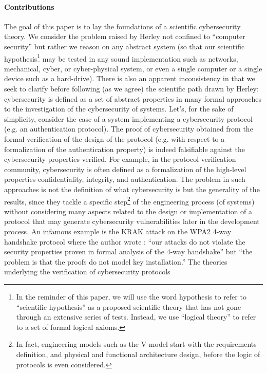 \documentclass[conference]{IEEEtran}
\begin{document}
\paragraph{Contributions} 
The goal of this paper is to lay the foundations of a scientific cybersecurity
theory.  We consider the problem raised by Herley not confined to ``computer
security'' but rather we reason on any abstract system (so that our scientific
hypothesis\footnote{In the reminder of this paper, we will use the word
hypothesis to refer to ``scientific hypothesis'' as a proposed scientific
theory that has not gone through an extensive series of tests. Instead, we
use ``logical theory'' to refer to a set of formal logical axioms.} may
be tested in any sound implementation such as networks, mechanical, cyber, or
cyber-physical system, or even a single computer or a single device such as a
hard-drive).  There is also an apparent inconsistency in
\autocite{Herley2016unfalsifiability} that we seek to clarify before following
(as we agree) the scientific path drawn by Herley: cybersecurity is defined as
a set of abstract properties in many formal approaches to the investigation of
the cybersecurity of systems.  Let's, for the sake of simplicity, consider the case
of a system implementing a cybersecurity protocol (e.g. an authentication protocol).
The proof of cybersecurity obtained from the formal verification of the design of
the protocol (e.g. with respect to a formalization of the authentication
property) is indeed falsifiable against the cybersecurity properties verified.  For
example, in the protocol verification community, cybersecurity is often defined
as a formalization of the high-level properties confidentiality, integrity, and
authentication. The problem in such approaches is not the definition of what
cybersecurity is but the generality of the results, since they tackle a
specific step\footnote{In fact, engineering models such as the V-model start
with the requirements definition, and physical and functional architecture
design, before the logic of protocols is even considered.} of the engineering
process (of systems) without considering many aspects related to the design or
implementation of a protocol that may generate cybersecurity vulnerabilities later
in the development process.  An infamous example is the KRAK attack on the WPA2
4-way handshake protocol where the author wrote \autocite{krak2020web}: ``our
attacks do not violate the security properties proven in formal analysis of the
4-way handshake'' but ``the problem is that the proofs do not model key
installation.'' The theories underlying the verification of cybersecurity protocols
\end{document}

